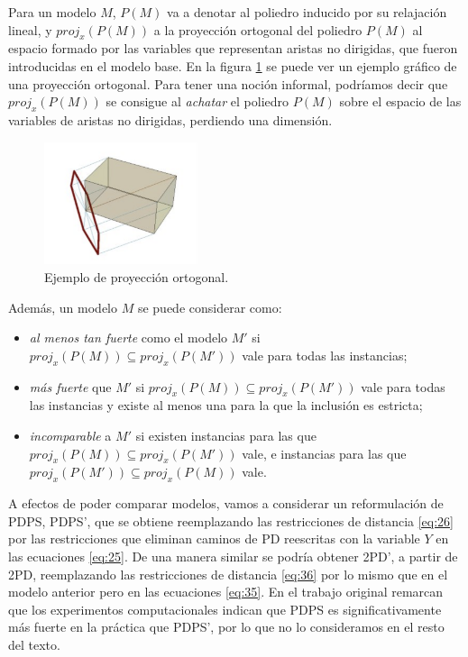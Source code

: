 \documentclass[10pt, a4paper]{article}
\theoremstyle{definition}
\begin{document}
Para un modelo $M$, $P(M)$ va a denotar al poliedro inducido por su relajación lineal, y $proj_{x}(P(M))$ a la proyección ortogonal del poliedro $P(M)$ al espacio formado por las variables que representan aristas no dirigidas, que fueron introducidas en el modelo base.
En la figura \ref{fig:ejemplo_proy} se puede ver un ejemplo gráfico de una proyección ortogonal. Para tener una noción informal, podríamos decir que  $proj_{x}(P(M))$ se consigue al \textit{achatar} el poliedro $P(M)$ sobre el espacio de las variables de aristas no dirigidas, perdiendo una dimensión.

\begin{figure}[H]
  \centering
  \includegraphics[width=0.4\textwidth]{ejemplo_proy.png}
  \caption{Ejemplo de proyección ortogonal.}
  \label{fig:ejemplo_proy}
\end{figure}

Además, un modelo $M$ se puede considerar como:

\begin{itemize}
	\item \textit{al menos tan fuerte} como el modelo $M'$ si $proj_{x}(P(M)) \subseteq proj_{x}(P(M'))$ vale para todas las instancias;
	\item \textit{más fuerte} que $M'$ si $proj_{x}(P(M)) \subseteq proj_{x}(P(M'))$ vale para todas las instancias y existe al menos una para la que la inclusión es estricta;
	\item \textit{incomparable} a $M'$ si existen instancias para las que $proj_{x}(P(M)) \subseteq proj_{x}(P(M'))$ vale, e instancias para las que $proj_{x}(P(M')) \subseteq proj_{x}(P(M))$ vale.
\end{itemize}

A efectos de poder comparar modelos, vamos a considerar un reformulación de PDPS, PDPS', que se obtiene reemplazando las restricciones de distancia \ref{eq:26} por las restricciones que eliminan caminos de PD reescritas con la variable $Y$ en las ecuaciones \ref{eq:25}. De una manera similar se podría obtener 2PD', a partir de 2PD, reemplazando las restricciones de distancia \ref{eq:36} por lo mismo que en el modelo anterior pero en las ecuaciones \ref{eq:35}. En el trabajo original remarcan que los experimentos computacionales indican que PDPS es significativamente más fuerte en la práctica que PDPS', por lo que no lo consideramos en el resto del texto.
\end{document}
